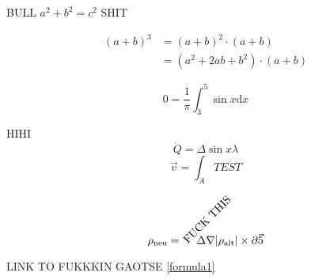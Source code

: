 \documentclass[ngerman]{scrartcl}
\begin{document}
BULL $ a^2 + b^2 = c^2$ SHIT

\begin{align*}
	(a+b)^3 &= (a+b)^2\cdot(a+b) \\
	&= (a^2 + 2ab+b^2) \cdot (a+b)
\end{align*}

\begin{equation}
	0 = \frac{1}{\pi} \int_{3}^{5} {\sin x} {\mathrm{d}x}
\end{equation}

\newpage

HIHI
\begin{equation}
	\dot{Q} = \Delta \sin x \lambda
\end{equation}
\begin{equation}
	\vec{v} = \int_{A} TEST
\end{equation}

\begin{equation}
	\rho_\text{neu} = \rotatebox{45}{FUCK THIS}\!\!\!\!\!\!\!\!\!\!\!\!\!\!\!\!\!\!\!\Delta\nabla|{\rho_\mathrm{alt}}| \times \partial\vec{5}
\end{equation}


LINK TO FUKKKIN GAOTSE \cref{formula1}
\end{document}
